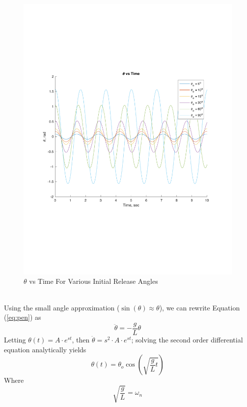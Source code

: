 \documentclass[12pt]{report}
\begin{document}
\begin{flushleft}
\begin{figure}[h]
\begin{minipage}[c]{.15\textwidth}
  \includegraphics[frame,center]{thetalegend}
  \vspace{1ex}
\end{minipage}
  \caption{$\theta$ vs Time For Various Initial Release Angles}
  \label{fig:thetatime}
\end{figure}
~\\
Using the small angle approximation ($\sin(\theta)\approx\theta$), we can rewrite
Equation (\ref{eq:pen}) as
$$\ddot{\theta} = -\frac{g}{L}\theta$$
Letting $\theta(t) = A\cdot e^{st}$, then $\ddot{\theta} = s^2 \cdot A \cdot e^{st}$;
solving the second order differential equation analytically yields
$$\theta(t) = \theta_o\cos(\sqrt{\frac{g}{L}t})$$
Where
$$\sqrt{\frac{g}{L}} = \omega_n$$
\begin{figure}[ht]

\end{figure}
\end{flushleft}
\end{document}

